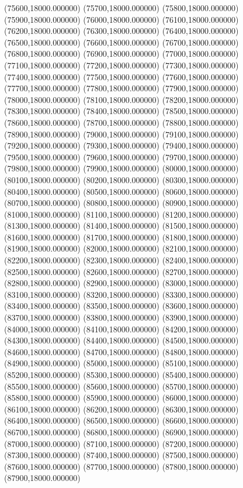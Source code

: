 (75600,18000.000000)
(75700,18000.000000)
(75800,18000.000000)
(75900,18000.000000)
(76000,18000.000000)
(76100,18000.000000)
(76200,18000.000000)
(76300,18000.000000)
(76400,18000.000000)
(76500,18000.000000)
(76600,18000.000000)
(76700,18000.000000)
(76800,18000.000000)
(76900,18000.000000)
(77000,18000.000000)
(77100,18000.000000)
(77200,18000.000000)
(77300,18000.000000)
(77400,18000.000000)
(77500,18000.000000)
(77600,18000.000000)
(77700,18000.000000)
(77800,18000.000000)
(77900,18000.000000)
(78000,18000.000000)
(78100,18000.000000)
(78200,18000.000000)
(78300,18000.000000)
(78400,18000.000000)
(78500,18000.000000)
(78600,18000.000000)
(78700,18000.000000)
(78800,18000.000000)
(78900,18000.000000)
(79000,18000.000000)
(79100,18000.000000)
(79200,18000.000000)
(79300,18000.000000)
(79400,18000.000000)
(79500,18000.000000)
(79600,18000.000000)
(79700,18000.000000)
(79800,18000.000000)
(79900,18000.000000)
(80000,18000.000000)
(80100,18000.000000)
(80200,18000.000000)
(80300,18000.000000)
(80400,18000.000000)
(80500,18000.000000)
(80600,18000.000000)
(80700,18000.000000)
(80800,18000.000000)
(80900,18000.000000)
(81000,18000.000000)
(81100,18000.000000)
(81200,18000.000000)
(81300,18000.000000)
(81400,18000.000000)
(81500,18000.000000)
(81600,18000.000000)
(81700,18000.000000)
(81800,18000.000000)
(81900,18000.000000)
(82000,18000.000000)
(82100,18000.000000)
(82200,18000.000000)
(82300,18000.000000)
(82400,18000.000000)
(82500,18000.000000)
(82600,18000.000000)
(82700,18000.000000)
(82800,18000.000000)
(82900,18000.000000)
(83000,18000.000000)
(83100,18000.000000)
(83200,18000.000000)
(83300,18000.000000)
(83400,18000.000000)
(83500,18000.000000)
(83600,18000.000000)
(83700,18000.000000)
(83800,18000.000000)
(83900,18000.000000)
(84000,18000.000000)
(84100,18000.000000)
(84200,18000.000000)
(84300,18000.000000)
(84400,18000.000000)
(84500,18000.000000)
(84600,18000.000000)
(84700,18000.000000)
(84800,18000.000000)
(84900,18000.000000)
(85000,18000.000000)
(85100,18000.000000)
(85200,18000.000000)
(85300,18000.000000)
(85400,18000.000000)
(85500,18000.000000)
(85600,18000.000000)
(85700,18000.000000)
(85800,18000.000000)
(85900,18000.000000)
(86000,18000.000000)
(86100,18000.000000)
(86200,18000.000000)
(86300,18000.000000)
(86400,18000.000000)
(86500,18000.000000)
(86600,18000.000000)
(86700,18000.000000)
(86800,18000.000000)
(86900,18000.000000)
(87000,18000.000000)
(87100,18000.000000)
(87200,18000.000000)
(87300,18000.000000)
(87400,18000.000000)
(87500,18000.000000)
(87600,18000.000000)
(87700,18000.000000)
(87800,18000.000000)
(87900,18000.000000)
